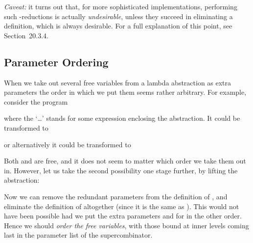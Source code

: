 \textit{Caveat:} it turns out that, for more sophisticated implementations,
performing such \te-reductions is actually \textit{undesirable}, unless they succeed in
eliminating a definition, which is always desirable. For a full explanation of
this point, see Section~20.3.4.

\subsection{Parameter Ordering}

When we take out several free variables from a lambda abstraction as extra
parameters the order in which we put them seems rather arbitrary. For
example, consider the program


\noindent
where the `\ldots' stands for some expression enclosing the  abstraction. It
could be transformed to


\noindent
or alternatively it could be transformed to


\noindent
Both  and  are free, and it does not seem to matter which order we take them
out in. However, let us take the second possibility one stage further, by lifting
the  abstraction:


\noindent
Now we can remove the redundant parameters from the definition of , and
eliminate the definition of  altogether (since it is the same as ). This
would not have been possible had we put the extra parameters  and  for  in
the other order. Hence we should \textit{order the free variables}, with those bound at
inner levels coming last in the parameter list of the supercombinator.

